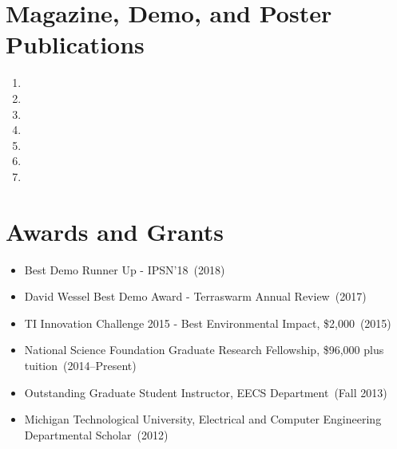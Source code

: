 \documentclass{article}
\begin{document}
\section*{Magazine, Demo, and Poster Publications}
\begin{enumerate}
  \item {}
  \item {}
  \item {}
  \item {}
  \item {}
  \item {}
  \item {}
\end{enumerate}




\section*{Awards and Grants}
\vspace{-6pt}
\begin{itemize}
  \item[] Best Demo Runner Up - IPSN'18~(2018)
  \item[] David Wessel Best Demo Award - Terraswarm Annual Review~(2017)
  \item[] TI Innovation Challenge 2015 - Best Environmental Impact, \$2,000~(2015)
  \item[] National Science Foundation Graduate Research Fellowship, \$96,000 plus tuition~(2014--Present)
  \item[] Outstanding Graduate Student Instructor, EECS Department~(Fall 2013)
  \item[] Michigan Technological University, Electrical and Computer Engineering Departmental Scholar~(2012)
\end{itemize}
\end{document}
